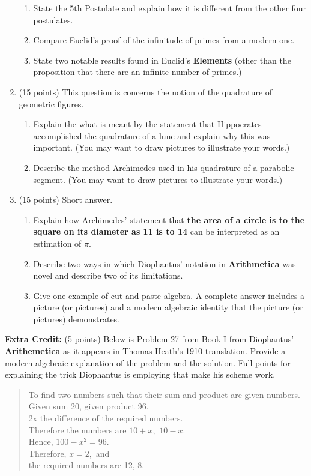 \documentclass[12pt]{article}
\renewcommand{\emph}[1]{\textsf{\textbf{#1}}}
\newcommand{\be}{\begin{enumerate}}
\newcommand{\ee}{\end{enumerate}}
\begin{document}
\begin{enumerate}
\begin{enumerate}
	\item State the 5th Postulate and explain how it is different from the other four postulates.\\
	\vfill
	\item Compare Euclid's proof of the infinitude of primes from a modern one.  \\
	\vfill
	\item State two notable results found in Euclid's \emph{Elements} (other than the proposition that there are an infinite number of primes.)
	\vfill
	\end{enumerate}
\newpage
\item (15 points) This question is concerns the notion of the quadrature of geometric figures.
	\begin{enumerate}
	\item Explain the what is meant by the statement that Hippocrates accomplished the quadrature of a lune and explain why this was important. (You may want to draw pictures to illustrate your words.)\\
	\vfill
	\item Describe the method Archimedes used in his quadrature of a parabolic segment. (You may want to draw pictures to illustrate your words.)\\
	\ee
	\vfill
\newpage
\item (15 points) Short answer.
	\be
	\item Explain how Archimedes' statement that \emph{the area of a circle is to the square on its diameter as 11 is to 14} can be interpreted as an estimation of $\pi$.
	\vfill
	\item Describe two ways in which Diophantus' notation in \emph{Arithmetica} was novel and describe two of its limitations.
	\vfill
	\item  Give one example of cut-and-paste algebra. A complete answer includes a picture (or pictures) and a modern algebraic identity that the picture (or pictures) demonstrates.
	\vfill
	
	\end{enumerate}
\ee
\newpage
\textbf{Extra Credit:} (5 points) Below is Problem 27 from Book I from Diophantus' \emph{Arithemetica} as it appears in Thomas Heath's 1910 translation. Provide a modern algebraic explanation of the problem and the solution. Full points for explaining the trick Diophantus is employing that make his scheme work.\\

\begin{quote}
To find two numbers such that their sum and product are given numbers.\\

Given sum 20, given product 96.\\
2x the difference of the required numbers.\\
Therefore the numbers are $10+x,$ $10-x.$\\
Hence, $100-x^2=96.$\\
Therefore, $x=2,$ and \\
\quad \hspace{1cm} the required numbers are 12, 8.
\end{quote}
\end{document}
